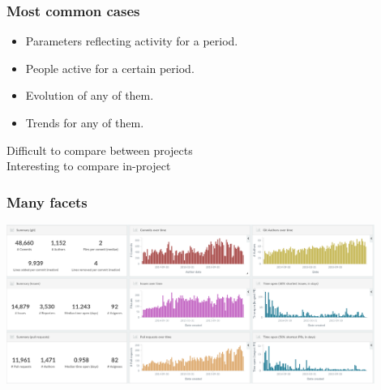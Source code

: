 \documentclass[17pt,aspectratio=169,hyperref=pdfusetitle]{beamer}
\begin{document}

\begin{frame}
\frametitle{Most common cases}

  \begin{itemize}
  \item Parameters reflecting activity for a period.
  \item People active for a certain period.
  \item Evolution of any of them.
  \item Trends for any of them.
  \end{itemize}
\vspace{.5cm}

\begin{flushright}
  Difficult to compare between projects \\  
  Interesting to compare in-project \\
\end{flushright}
\end{frame}


\begin{frame}
\frametitle{Many facets}

\begin{center}
  \includegraphics[width=12cm]{figs/activity-elastic}
  
\end{center}

\end{frame}

\end{document}
